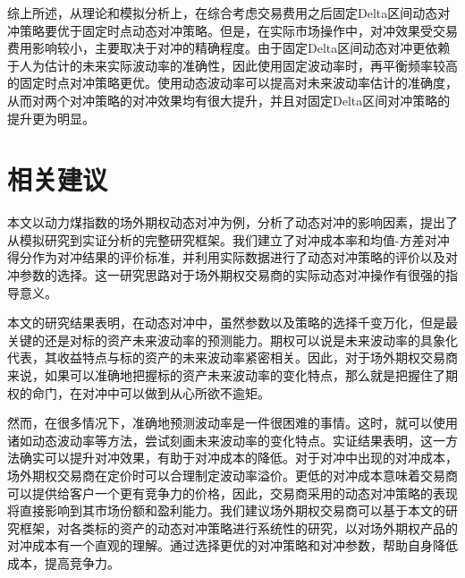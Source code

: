 综上所述，从理论和模拟分析上，在综合考虑交易费用之后固定Delta区间动态对冲策略要优于固定时点动态对冲策略。但是，在实际市场操作中，对冲效果受交易费用影响较小，主要取决于对冲的精确程度。由于固定Delta区间动态对冲更依赖于人为估计的未来实际波动率的准确性，因此使用固定波动率时，再平衡频率较高的固定时点对冲策略更优。使用动态波动率可以提高对未来波动率估计的准确度，从而对两个对冲策略的对冲效果均有很大提升，并且对固定Delta区间对冲策略的提升更为明显。

\section{相关建议}

本文以动力煤指数的场外期权动态对冲为例，分析了动态对冲的影响因素，提出了从模拟研究到实证分析的完整研究框架。我们建立了对冲成本率和均值-方差对冲得分作为对冲结果的评价标准，并利用实际数据进行了动态对冲策略的评价以及对冲参数的选择。这一研究思路对于场外期权交易商的实际动态对冲操作有很强的指导意义。

本文的研究结果表明，在动态对冲中，虽然参数以及策略的选择千变万化，但是最关键的还是对标的资产未来波动率的预测能力。期权可以说是未来波动率的具象化代表，其收益特点与标的资产的未来波动率紧密相关。因此，对于场外期权交易商来说，如果可以准确地把握标的资产未来波动率的变化特点，那么就是把握住了期权的命门，在对冲中可以做到从心所欲不逾矩。

然而，在很多情况下，准确地预测波动率是一件很困难的事情。这时，就可以使用诸如动态波动率等方法，尝试刻画未来波动率的变化特点。实证结果表明，这一方法确实可以提升对冲效果，有助于对冲成本的降低。对于对冲中出现的对冲成本，场外期权交易商在定价时可以合理制定波动率溢价。更低的对冲成本意味着交易商可以提供给客户一个更有竞争力的价格，因此，交易商采用的动态对冲策略的表现将直接影响到其市场份额和盈利能力。我们建议场外期权交易商可以基于本文的研究框架，对各类标的资产的动态对冲策略进行系统性的研究，以对场外期权产品的对冲成本有一个直观的理解。通过选择更优的对冲策略和对冲参数，帮助自身降低成本，提高竞争力。
